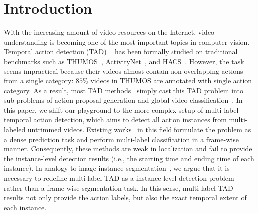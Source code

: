\documentclass{article}
\begin{document}
\section{Introduction}
With the increasing amount of video resources on the Internet, video understanding is becoming one of the most important topics in computer vision. Temporal action detection (TAD) ~\cite{DBLP:journals/ijcv/ZhaoXWWTL20,DBLP:conf/eccv/LinZSWY18, DBLP:conf/iccv/LinLLDW19, DBLP:conf/cvpr/ChaoVSRDS18, DBLP:conf/aaai/GaoSWLYGZ20, DBLP:conf/cvpr/Lin0LWTWLHF21, DBLP:conf/iccv/TanT0W21} has been formally studied on traditional benchmarks such as THUMOS~\cite{DBLP:journals/cviu/IdreesZJGLSS17}, ActivityNet~\cite{DBLP:conf/cvpr/HeilbronEGN15}, and HACS~\cite{DBLP:conf/iccv/Zhao0TY19}. 
However, the task seems impractical because their videos almost contain non-overlapping actions from a single category: $85\%$ videos in THUMOS are annotated with single action category. As a result, most TAD methods~\cite{DBLP:conf/eccv/LinZSWY18,DBLP:conf/iccv/LinLLDW19,DBLP:conf/cvpr/XuZRTG20,DBLP:journals/corr/abs-2112-03612,DBLP:conf/aaai/SuGWQY21} simply cast this TAD problem into sub-problems of action proposal generation and global video classification~\cite{DBLP:conf/cvpr/WangXLG17}.
In this paper, we shift our playground to the more complex setup of multi-label temporal action detection, which aims to detect all action instances from multi-labeled untrimmed videos. Existing works~\cite{DBLP:conf/wacv/DaiDMGFB21,DBLP:conf/cvpr/KahatapitiyaR21,DBLP:conf/cvpr/TirupatturDRS21,DBLP:conf/cvpr/DaiDKRB22} in this field formulate the problem as a dense prediction task and perform multi-label classification in a frame-wise manner. 
Consequently, these methods are weak in localization and fail to provide the instance-level detection results (i.e., the starting time and ending time of each instance).
In analogy to image instance segmentation~\cite{DBLP:conf/eccv/LinMBHPRDZ14}, we argue that it is necessary to redefine multi-label TAD as a instance-level detection problem rather than a frame-wise segmentation task.
In this sense, multi-label TAD results not only provide the action labels, but also the exact temporal extent of each instance.
\end{document}
